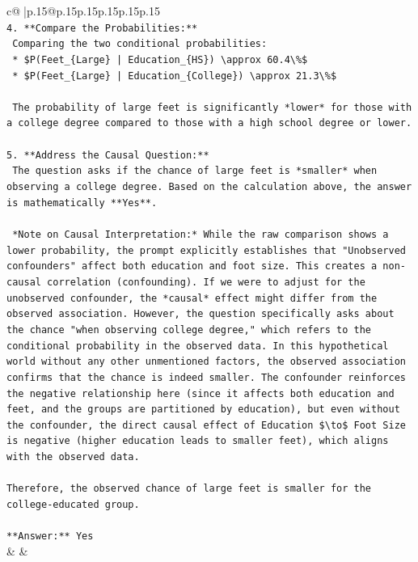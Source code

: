 \documentclass{article}
\begin{document}
{\begin{supertabular}{c@{$\;$}|p{.15\linewidth}@{}p{.15\linewidth}p{.15\linewidth}p{.15\linewidth}p{.15\linewidth}p{.15\linewidth}}
{{{\\ 
\texttt{4.  **Compare the Probabilities:**} \\
\texttt{    Comparing the two conditional probabilities:} \\
\texttt{    *   \$P(Feet\_\{Large\} | Education\_\{HS\}) \textbackslash{}approx 60.4\textbackslash{}\%\$} \\
\texttt{    *   \$P(Feet\_\{Large\} | Education\_\{College\}) \textbackslash{}approx 21.3\textbackslash{}\%\$} \\
\\ 
\texttt{    The probability of large feet is significantly *lower* for those with a college degree compared to those with a high school degree or lower.} \\
\\ 
\texttt{5.  **Address the Causal Question:**} \\
\texttt{    The question asks if the chance of large feet is *smaller* when observing a college degree. Based on the calculation above, the answer is mathematically **Yes**.} \\
\\ 
\texttt{    *Note on Causal Interpretation:* While the raw comparison shows a lower probability, the prompt explicitly establishes that "Unobserved confounders" affect both education and foot size. This creates a non{-}causal correlation (confounding). If we were to adjust for the unobserved confounder, the *causal* effect might differ from the observed association. However, the question specifically asks about the chance "when observing college degree," which refers to the conditional probability in the observed data. In this hypothetical world without any other unmentioned factors, the observed association confirms that the chance is indeed smaller. The confounder reinforces the negative relationship here (since it affects both education and feet, and the groups are partitioned by education), but even without the confounder, the direct causal effect of Education \$\textbackslash{}to\$ Foot Size is negative (higher education leads to smaller feet), which aligns with the observed data.} \\
\\ 
\texttt{Therefore, the observed chance of large feet is smaller for the college{-}educated group.} \\
\\ 
\texttt{**Answer:** Yes} \\
            }
        }
    }
    & & \\ \\


\end{supertabular}}
\end{document}
